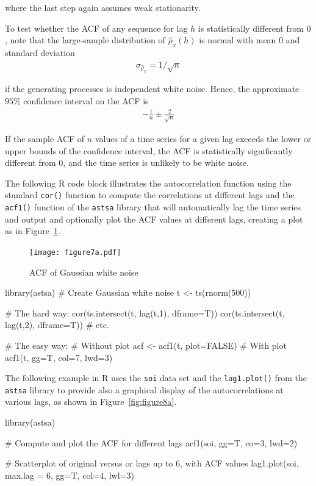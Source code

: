 \noindent where the last step again assumes weak stationarity.

To test whether the ACF of any sequence for lag $h$ is statistically different from $0$, note that the large-sample distribution of $\hat{\rho}_{x}(h)$ is normal with mean $0$ and standard deviation
\begin{align*}
\sigma_{\hat{\rho}_{x}} = 1/ \sqrt{n} 
\end{align*}

\noindent if the generating processes is independent white noise. Hence, the approximate $95\%$ confidence interval on the ACF is
\begin{align*}
-\frac{1}{n} \pm \frac{2}{\sqrt{n}}
\end{align*}

If the sample ACF of $n$ values of a time series for a given lag exceeds the lower or upper bounds of the confidence interval, the ACF is statistically significantly different from $0$, and the time series is unlikely to be white noise.

The following R code block illustrates the autocorrelation function using the standard \texttt{cor()} function to compute the correlations at different lags and the \texttt{acf1()} function of the \texttt{astsa} library that will automatically lag the time series and output and optionally plot the ACF values at different lags, creating a plot as in Figure~\ref{fig:figure7a}.

\begin{figure}
\centering
\texttt{[image: figure7a.pdf]}
\caption{ACF of Gaussian white noise}
\label{fig:figure7a}
\end{figure}

\begin{Rcode}
library(astsa)
# Create Gaussian white noise
t <- ts(rnorm(500))

# The hard way:
cor(ts.intersect(t, lag(t,1), dframe=T))
cor(ts.intersect(t, lag(t,2), dframe=T))
# etc.

# The easy way:
# Without plot
acf <- acf1(t, plot=FALSE)
# With plot
acf1(t, gg=T, col=7, lwd=3)
\end{Rcode}

The following example in R uses the \texttt{soi} data set and the \texttt{lag1.plot()} from the \texttt{astsa} library to provide also a graphical display of the autocorrelations at various lags, as shown in Figure~\ref{fig:figure8a}.

\begin{Rcode}
library(astsa)

# Compute and plot the ACF for different lags
acf1(soi, gg=T, co=3, lwd=2)

# Scatterplot of original versus or lags up to 6, with ACF values
lag1.plot(soi, max.lag = 6, gg=T, col=4, lwl=3)
\end{Rcode}

